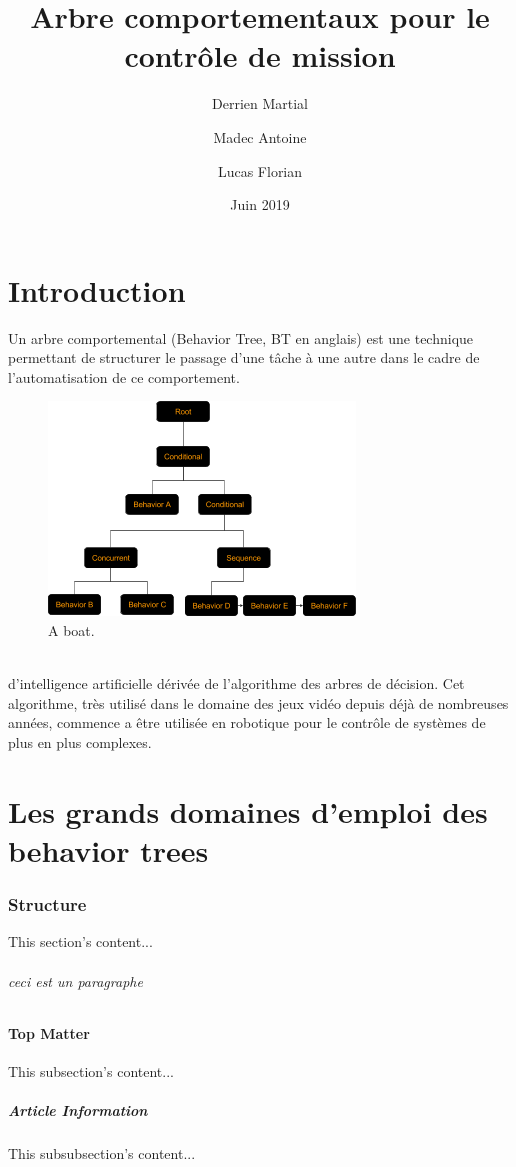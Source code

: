 \documentclass[titlepage]{article}
\title{Arbre comportementaux pour le contr\^ole de mission}
\author{
	Derrien Martial \\
	\and
	Madec Antoine \\
	\and
	Lucas Florian
}
\date{Juin 2019}
\begin{document}
	\maketitle
	\tableofcontents
	\hypersetup{linktocpage}
	
	\clearpage
	\part{Introduction}
	Un arbre comportemental (Behavior Tree, BT en anglais) est une
	technique permettant de structurer le passage d'une tâche à une autre dans 
	le cadre de l'automatisation de ce comportement. \cite{colledanchise_ogren_2018}
	\\
	\begin{figure}[h!]
		\includegraphics[width=\linewidth]{img/behavior_trees_example.png}
		\caption{A boat.}
		\label{fig:boat1}
	\end{figure}
	\\
	d’intelligence artificielle dérivée de l’algorithme des arbres
	de décision. \cite{rasmussen}
	Cet algorithme, très utilisé dans le domaine des jeux
	vidéo depuis déjà de nombreuses années, commence a être utilisée en
	robotique pour le contrôle de systèmes de plus en plus complexes.\cite{ros.org}
	
	\clearpage
	\part{Les grands domaines d'emploi des behavior trees}
	\section{Structure}
	This section's content...
	\paragraph{ceci est un paragraphe}	
	\subsection{Top Matter}
	This subsection's content...
	\subsubsection{Article Information}
	This subsubsection's content...
	
	\clearpage
	
	
	
\end{document}
